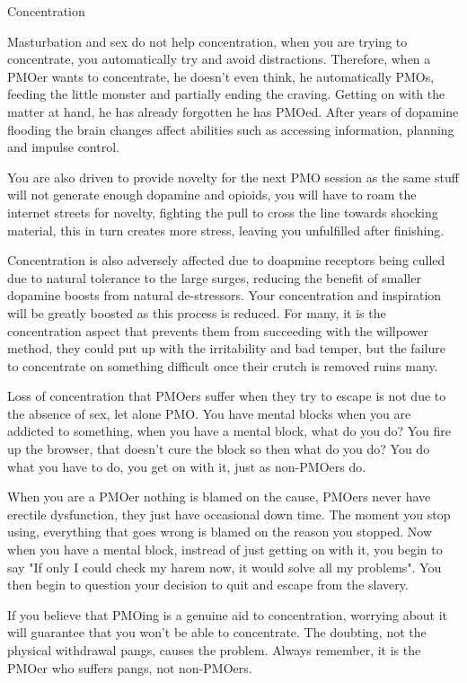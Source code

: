 Concentration

Masturbation and sex do not help concentration, when you are trying to concentrate, you automatically try and avoid distractions. Therefore, when a PMOer wants to concentrate, he doesn't even think, he automatically PMOs, feeding the little monster and partially ending the craving. Getting on with the matter at hand, he has already forgotten he has PMOed. After years of dopamine flooding the brain changes affect abilities such as accessing information, planning and impulse control.

You are also driven to provide novelty for the next PMO session as the same stuff will not generate enough dopamine and opioids, you will have to roam the internet streets for novelty, fighting the pull to cross the line towards shocking material, this in turn creates more stress, leaving you unfulfilled after finishing.

Concentration is also adversely affected due to doapmine receptors being culled due to natural tolerance to the large surges, reducing the benefit of smaller dopamine boosts from natural de-stressors. Your concentration and inspiration will be greatly boosted as this process is reduced. For many, it is the concentration aspect that prevents them from succeeding with the willpower method, they could put up with the irritability and bad temper, but the failure to concentrate on something difficult once their crutch is removed ruins many.

Loss of concentration that PMOers suffer when they try to escape is not due to the absence of sex, let alone PMO. You have mental blocks when you are addicted to something, when you have a mental block, what do you do? You fire up the browser, that doesn't cure the block so then what do you do? You do what you have to do, you get on with it, just as non-PMOers do.

When you are a PMOer nothing is blamed on the cause, PMOers never have erectile dysfunction, they just have occasional down time. The moment you stop using, everything that goes wrong is blamed on the reason you stopped. Now when you have a mental block, instread of just getting on with it, you begin to say "If only I could check my harem now, it would solve all my problems". You then begin to question your decision to quit and escape from the slavery.

If you believe that PMOing is a genuine aid to concentration, worrying about it will guarantee that you won't be able to concentrate. The doubting, not the physical withdrawal pangs, causes the problem. Always remember, it is the PMOer who suffers pangs, not non-PMOers.
